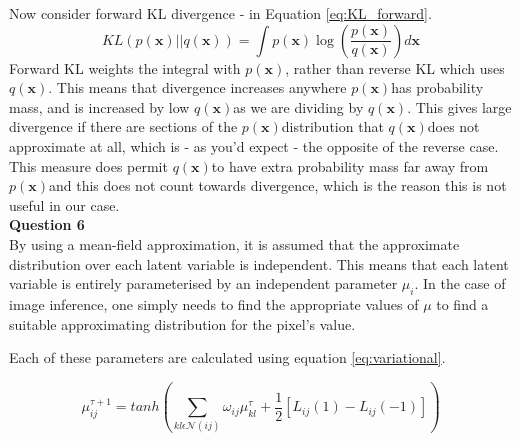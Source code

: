 \documentclass[10pt, a4paper, twocolumn]{article} %
\def \qx   {$q(\textbf{x})$}
\def \px   {$p(\textbf{x})$}
\begin{document}
Now consider forward KL divergence - in Equation \ref{eq:KL_forward}.
\begin{equation}
     KL(p(\mathbf{x})||q(\mathbf{x})) = \int p(\mathbf{x})\log\left(\frac{p(\mathbf{x})}{q(\mathbf{x})}\right)d\textbf{x}
     \label{eq:KL_forward}
\end{equation}
Forward KL weights the integral with \px, rather than reverse KL which uses \qx. This means that divergence increases anywhere \px has probability mass, and is increased by low \qx as we are dividing by \qx. This gives large divergence if there are sections of the \px distribution that \qx does not approximate at all, which is - as you'd expect - the opposite of the reverse case. This measure does permit \qx to have extra probability mass far away from \px and this does not count towards divergence, which is the reason this is not useful in our case.\\




\noindent\textbf{Question 6}\\By using a mean-field approximation, it is assumed that the approximate distribution over each latent variable is independent. This means that each latent variable is entirely parameterised by an independent parameter $\mu_i$. In the case of image inference, one simply needs to find the appropriate values of $\mu$ to find a suitable approximating distribution for the pixel's value.

Each of these parameters are calculated using equation \ref{eq:variational}.

\begin{equation}
    {\mu}_{ij}^{\tau+1} = tanh\left(\sum_{{kl}\epsilon\mathcal{N}(ij)} \omega_{ij}\mu_{kl}^\tau + \frac{1}{2}\left[L_{ij}(1) - L_{ij}(-1)\right] \right)
    \label{eq:variational}
\end{equation}
\end{document}
